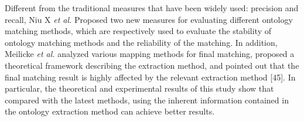 \documentclass[twoside]{article}
\begin{document}

Different from the traditional measures that have been widely used: precision and recall, Niu X {\it et al.} Proposed two new measures for evaluating different ontology matching methods, which are respectively used to evaluate the stability of ontology matching methods and the reliability of the matching\cite{wwy44}.
In addition, Meilicke {\it et al.} analyzed various mapping methods for final matching, proposed a theoretical framework describing the extraction method, and pointed out that the final matching result is highly affected by the relevant extraction method [45]. In particular, the theoretical and experimental results of this study show that compared with the latest methods, using the inherent information contained in the ontology extraction method can achieve better results.
\end{document}
